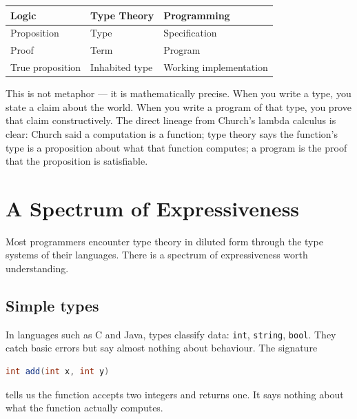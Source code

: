\documentclass[12pt]{article}
\begin{document}
\vspace{0.6em}
\begin{center}
\begin{tabular}{@{}lll@{}}
\toprule
\textbf{Logic} & \textbf{Type Theory} & \textbf{Programming} \\
\midrule
Proposition      & Type                 & Specification         \\
Proof            & Term                 & Program               \\
True proposition & Inhabited type       & Working implementation \\
\bottomrule
\end{tabular}
\end{center}
\vspace{0.6em}

This is not metaphor --- it is mathematically precise. When you write a type,
you state a claim about the world. When you write a program of that type, you
prove that claim constructively. The direct lineage from Church's lambda
calculus is clear: Church said a computation is a function; type theory says
the function's type is a proposition about what that function computes; a
program is the proof that the proposition is satisfiable.

\section{A Spectrum of Expressiveness}

Most programmers encounter type theory in diluted form through the type
systems of their languages. There is a spectrum of expressiveness worth
understanding.

\subsection{Simple types}

In languages such as C and Java, types classify data: \texttt{int},
\texttt{string}, \texttt{bool}. They catch basic errors but say almost
nothing about behaviour. The signature

\begin{lstlisting}[language=Java]
int add(int x, int y)
\end{lstlisting}

tells us the function accepts two integers and returns one. It says nothing
about what the function actually computes.
\end{document}
